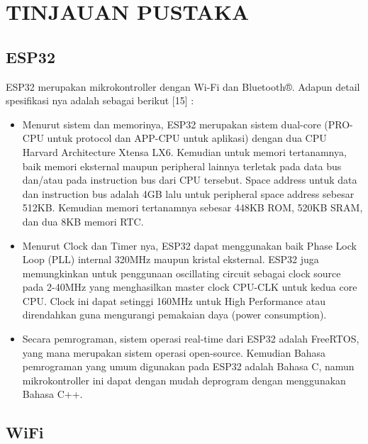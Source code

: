 
\section{TINJAUAN PUSTAKA}


\subsection{ESP32}
\label{sec:esp32}

ESP32 merupakan mikrokontroller dengan Wi-Fi dan Bluetooth®. Adapun detail spesifikasi nya adalah sebagai berikut [15] :
\begin{itemize}
	\item Menurut sistem dan memorinya, ESP32 merupakan sistem dual-core (PRO-CPU untuk protocol dan APP-CPU untuk aplikasi) dengan dua CPU Harvard Architecture Xtensa LX6. Kemudian untuk memori tertanamnya, baik memori eksternal maupun peripheral lainnya terletak pada data bus dan/atau pada instruction bus dari CPU tersebut. Space address untuk data dan instruction bus adalah 4GB lalu untuk peripheral space address sebesar 512KB. Kemudian memori tertanamnya sebesar 448KB ROM, 520KB SRAM, dan dua 8KB memori RTC.
	\item Menurut Clock dan Timer nya, ESP32 dapat menggunakan baik Phase Lock Loop (PLL) internal 320MHz maupun kristal eksternal. ESP32 juga memungkinkan untuk penggunaan oscillating circuit sebagai clock source pada 2-40MHz yang menghasilkan master clock CPU-CLK untuk kedua core CPU. Clock ini dapat setinggi 160MHz untuk High Performance atau direndahkan guna mengurangi pemakaian daya (power consumption).
	\item Secara pemrograman, sistem operasi real-time dari ESP32 adalah FreeRTOS, yang mana merupakan sistem operasi open-source. Kemudian Bahasa pemrograman yang umum digunakan pada ESP32 adalah Bahasa C, namun mikrokontroller ini dapat dengan mudah deprogram dengan menggunakan Bahasa C++.
\end{itemize}

\subsection{WiFi}
\label{sec:wifi}

